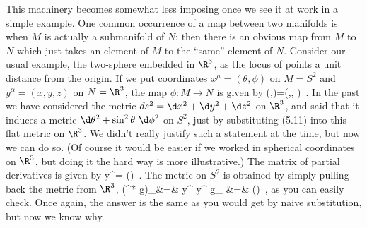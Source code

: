 This machinery becomes somewhat less imposing once we see it at work
in a simple example.  One common occurrence of a map between two
manifolds is when $M$ is actually a submanifold of $N$; then there is
an obvious map from $M$ to $N$ which just takes an element of $M$ to
the ``same'' element of $N$.  Consider our usual example, the two-sphere
embedded in $\R^3$, as the locus of points a unit distance from the 
origin.  If we put coordinates $x^\mu=(\theta,\phi)$ on $M=S^2$ and 
$y^\alpha=(x,y,z)$ on $N=\R^3$, the map $\phi:M\rightarrow N$ is given by
\be
  \phi(\theta,\phi)=(\sin\theta \cos\phi,\sin\theta \sin\phi,
  \cos\theta)\ .\label{5.11}
\ee
In the past we have considered the metric $ds^2=\d x^2+\d y^2+ \d z^2$
on $\R^3$, and said that it induces a metric $\d\theta^2 +\sin^2\theta
~\d\phi^2$ on $S^2$, just by substituting (5.11) into this flat metric
on $\R^3$.  We didn't really justify such a statement at the
time, but now we can do so.  (Of course it would be easier if we
worked in spherical coordinates on $\R^3$, but doing it the hard way
is more illustrative.)  The matrix of partial derivatives is given
by
\be
  {{\partial y^{\alpha}}}=
  \left(\matrix{\cos\theta \cos\phi &\cos\theta \sin\phi &-\sin\theta\cr
  -\sin\theta \sin\phi &\sin\theta \cos\phi & 0\cr}\right)\ .\label{5.12}
\ee
The metric on $S^2$ is obtained by simply pulling back the metric from
$\R^3$,
\bea
  (\phi^* g)_\mn &=&  {{\partial y^{\alpha}}
  }{{\partial y^{\beta}}
  }g_{\alpha\beta}\cr
  &=& \left(\right)\ ,\label{5.13}
\eea
as you can easily check.  Once again, the answer is the same as you
would get by naive substitution, but now we know why.

